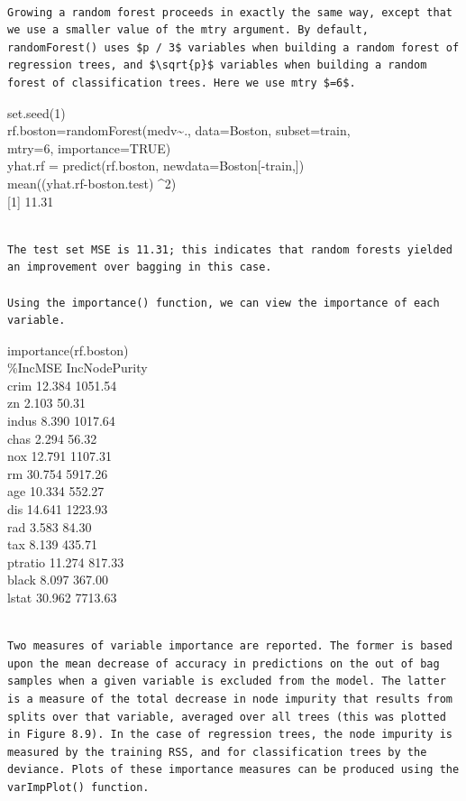 \documentclass[10pt]{article}
\begin{document}
\begin{verbatim}

Growing a random forest proceeds in exactly the same way, except that we use a smaller value of the mtry argument. By default, randomForest() uses $p / 3$ variables when building a random forest of regression trees, and $\sqrt{p}$ variables when building a random forest of classification trees. Here we use mtry $=6$.
\end{verbatim}

\begin{displayquote}
set.seed(1)\\
rf.boston=randomForest(medv\~{}., data=Boston, subset=train,\\
mtry=6, importance=TRUE)\\[0pt]
yhat.rf = predict(rf.boston, newdata=Boston[-train,])\\
mean((yhat.rf-boston.test) \^{}2)\\[0pt]
[1] 11.31
\end{displayquote}

\begin{verbatim}

The test set MSE is 11.31; this indicates that random forests yielded an improvement over bagging in this case.

Using the importance() function, we can view the importance of each variable.
\end{verbatim}

\begin{displayquote}
importance(rf.boston)\\
\%IncMSE IncNodePurity\\
crim 12.384 1051.54\\
zn 2.103 50.31\\
indus 8.390 1017.64\\
chas 2.294 56.32\\
nox 12.791 1107.31\\
rm 30.754 5917.26\\
age 10.334 552.27\\
dis 14.641 1223.93\\
rad 3.583 84.30\\
tax 8.139 435.71\\
ptratio 11.274 817.33\\
black 8.097 367.00\\
lstat 30.962 7713.63
\end{displayquote}

\begin{verbatim}

Two measures of variable importance are reported. The former is based upon the mean decrease of accuracy in predictions on the out of bag samples when a given variable is excluded from the model. The latter is a measure of the total decrease in node impurity that results from splits over that variable, averaged over all trees (this was plotted in Figure 8.9). In the case of regression trees, the node impurity is measured by the training RSS, and for classification trees by the deviance. Plots of these importance measures can be produced using the varImpPlot() function.
\end{verbatim}
\end{document}

